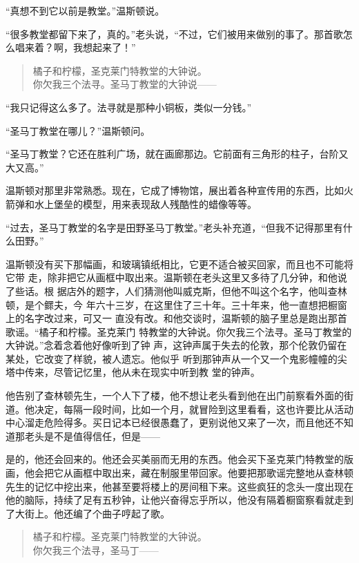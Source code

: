 ``真想不到它以前是教堂。''温斯顿说。

``很多教堂都留下来了，真的。''老头说，``不过，它们被用来做别的事了。那首歌怎么唱来着？啊，我想起来了！''

\begin{quotation}
\noindent 橘子和柠檬，圣克莱门特教堂的大钟说。\\
你欠我三个法寻。圣马丁教堂的大钟说——
\end{quotation}

``我只记得这么多了。法寻就是那种小铜板，类似一分钱。''

``圣马丁教堂在哪儿？''温斯顿问。

``圣马丁教堂？它还在胜利广场，就在画廊那边。它前面有三角形的柱子，台阶又大又高。''

温斯顿对那里非常熟悉。现在，它成了博物馆，展出着各种宣传用的东西，比如火箭弹和水上堡垒的模型，用来表现敌人残酷性的蜡像等等。

``过去，圣马丁教堂的名字是田野圣马丁教堂。''老头补充道，``但我不记得那里有什么田野。''

温斯顿没有买下那幅画，和玻璃镇纸相比，它更不适合被买回家，而且也不可能将它带
走，除非把它从画框中取出来。温斯顿在老头这里又多待了几分钟，和他说了些话。根
据店外的题字，人们猜测他叫威克斯，但他不叫这个名字，他叫查林顿，是个鳏夫，今
年六十三岁，在这里住了三十年。三十年来，他一直想把橱窗上的名字改过来，可又一
直没有改。和他交谈时，温斯顿的脑子里总是跑出那首歌谣。``橘子和柠檬。圣克莱门
特教堂的大钟说。你欠我三个法寻。圣马丁教堂的大钟说。''念着念着他好像听到了钟
声，这钟声属于失去的伦敦，那个伦敦仍留在某处，它改变了样貌，被人遗忘。他似乎
听到那钟声从一个又一个鬼影幢幢的尖塔中传来，尽管记忆里，他从未在现实中听到教
堂的钟声。

他告别了查林顿先生，一个人下了楼，他不想让老头看到他在出门前察看外面的街道。他决定，每隔一段时间，比如一个月，就冒险到这里看看，这也许要比从活动中心溜走危险得多。买日记本已经很愚蠢了，更别说他又来了一次，而且他还不知道那老头是不是值得信任，但是——

是的，他还会回来的。他还会买美丽而无用的东西。他会买下圣克莱门特教堂的版画，他会把它从画框中取出来，藏在制服里带回家。他要把那歌谣完整地从查林顿先生的记忆中挖出来，他甚至要将楼上的房间租下来。这些疯狂的念头一度出现在他的脑际，持续了足有五秒钟，让他兴奋得忘乎所以，他没有隔着橱窗察看就走到了大街上。他还编了个曲子哼起了歌。

\begin{quotation}
\noindent 橘子和柠檬。圣克莱门特教堂的大钟说。\\
你欠我三个法寻，圣马丁——
\end{quotation}


